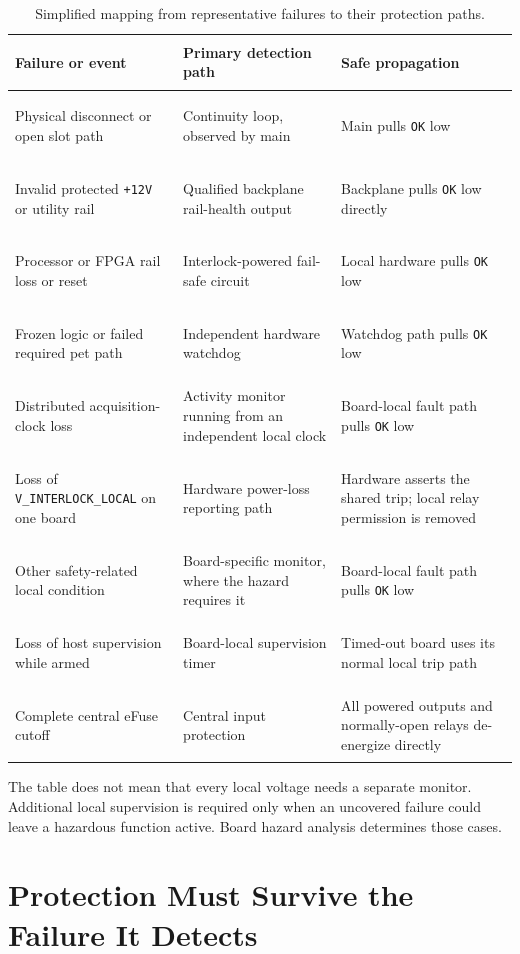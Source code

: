 \begin{table}[htbp]
\centering
\small
\begin{tabularx}{\textwidth}{@{}>{\bfseries\raggedright\arraybackslash}p{}>{\raggedright\arraybackslash}p{}>{\raggedright\arraybackslash}X@{}}
\toprule
Failure or event & Primary detection path & Safe propagation \\
\midrule
Physical disconnect or open slot path & Continuity loop, observed by main & Main pulls \texttt{OK} low \\
Invalid protected \texttt{+12V} or utility rail & Qualified backplane rail-health output & Backplane pulls \texttt{OK} low directly \\
Processor or FPGA rail loss or reset & Interlock-powered fail-safe circuit & Local hardware pulls \texttt{OK} low \\
Frozen logic or failed required pet path & Independent hardware watchdog & Watchdog path pulls \texttt{OK} low \\
Distributed acquisition-clock loss & Activity monitor running from an independent local clock & Board-local fault path pulls \texttt{OK} low \\
Loss of \texttt{V\_INTERLOCK\_LOCAL} on one board & Hardware power-loss reporting path & Hardware asserts the shared trip; local relay permission is removed \\
Other safety-related local condition & Board-specific monitor, where the hazard requires it & Board-local fault path pulls \texttt{OK} low \\
Loss of host supervision while armed & Board-local supervision timer & Timed-out board uses its normal local trip path \\
Complete central eFuse cutoff & Central input protection & All powered outputs and normally-open relays de-energize directly \\
\bottomrule
\end{tabularx}
\caption{Simplified mapping from representative failures to their protection paths.}
\label{tab:fault-paths}
\end{table}

The table does not mean that every local voltage needs a separate monitor. Additional local supervision is required only when an uncovered failure could leave a hazardous function active. Board hazard analysis determines those cases.

\section{Protection Must Survive the Failure It Detects}

